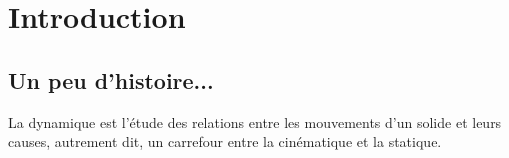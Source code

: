 \documentclass[12pt]{article}
\begin{document}
\UPSTIbuildPage

\renewcommand{\baselinestretch}{0.1}
\setcounter{tocdepth}{2}
{\small{\tableofcontents}}

\renewcommand{\baselinestretch}{1}\normalsize

\newpage
\section{Introduction}

\subsection{Un peu d'histoire...}

La dynamique est l'étude des relations entre les mouvements d'un solide et leurs causes, autrement dit, un carrefour entre la cinématique et la statique.
\end{document}
